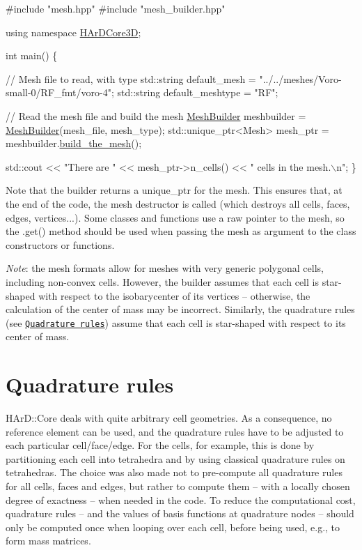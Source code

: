 \begin{DoxyCode}
\textcolor{preprocessor}{#include "mesh.hpp"}
\textcolor{preprocessor}{#include "mesh\_builder.hpp"}

\textcolor{keyword}{using namespace }\hyperlink{namespaceHArDCore3D}{HArDCore3D};

\textcolor{keywordtype}{int} main() \{

    \textcolor{comment}{// Mesh file to read, with type}
    std::string default\_mesh = \textcolor{stringliteral}{"../../meshes/Voro-small-0/RF\_fmt/voro-4"};
    std::string default\_meshtype = \textcolor{stringliteral}{"RF"};

    \textcolor{comment}{// Read the mesh file and build the mesh}
    \hyperlink{classHArDCore3D_1_1MeshBuilder}{MeshBuilder} meshbuilder = \hyperlink{classHArDCore3D_1_1MeshBuilder}{MeshBuilder}(mesh\_file, mesh\_type);
    std::unique\_ptr<Mesh> mesh\_ptr = meshbuilder.\hyperlink{classHArDCore3D_1_1MeshBuilder_a208c94e8cb6490226215b59eb67e7911}{build\_the\_mesh}();

    std::cout << \textcolor{stringliteral}{"There are "} << mesh\_ptr->n\_cells() << \textcolor{stringliteral}{" cells in the mesh.\(\backslash\)n"};
\}
\end{DoxyCode}


Note that the builder returns a {\ttfamily unique\+\_\+ptr} for the mesh. This ensures that, at the end of the code, the mesh destructor is called (which destroys all cells, faces, edges, vertices...). Some classes and functions use a raw pointer to the mesh, so the {\ttfamily .get()} method should be used when passing the mesh as argument to the class constructors or functions.

{\itshape Note}\+: the mesh formats allow for meshes with very generic polygonal cells, including non-\/convex cells. However, the builder assumes that each cell is star-\/shaped with respect to the isobarycenter of its vertices -- otherwise, the calculation of the center of mass may be incorrect. Similarly, the quadrature rules (see \href{#quad_rules}{\tt Quadrature rules}) assume that each cell is star-\/shaped with respect to its center of mass.

\label{_quad_rules}%
 \hypertarget{index_quad_rules}{}\section{Quadrature rules}\label{index_quad_rules}
H\+Ar\+D\+::\+Core deals with quite arbitrary cell geometries. As a consequence, no reference element can be used, and the quadrature rules have to be adjusted to each particular cell/face/edge. For the cells, for example, this is done by partitioning each cell into tetrahedra and by using classical quadrature rules on tetrahedras. The choice was also made not to pre-\/compute all quadrature rules for all cells, faces and edges, but rather to compute them -- with a locally chosen degree of exactness -- when needed in the code. To reduce the computational cost, quadrature rules -- and the values of basis functions at quadrature nodes -- should only be computed once when looping over each cell, before being used, e.\+g., to form mass matrices.

